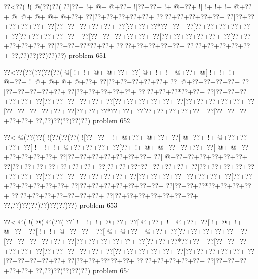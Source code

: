 \vbox{\vbox{\goo
\0??<\0??(\- !(\- @(\0??(\0??(
\0??[\0??+\- !+\- @+\- @+\0??+
\- ![\0??+\0??+\- !+\- @+\0??+
\- ![\- !+\- !+\- !+\- @+\0??+
\- @[\- @+\- @+\- @+\- @+\0??+
\0??[\0??+\0??+\0??+\0??+\0??+
\0??[\0??+\0??+\0??+\0??+\0??+
\0??[\0??+\0??+\0??+\0??+\0??+
\0??[\0??+\0??+\0??+\0??+\0??+
\0??[\0??+\0??+\0??*\0??+\0??+
\0??[\0??+\0??+\0??+\0??+\0??+
\0??[\0??+\0??+\0??+\0??+\0??+
\0??[\0??+\0??+\0??+\0??+\0??+
\0??[\0??+\0??+\0??+\0??+\0??+
\0??[\0??+\0??+\0??+\0??+\0??+
\0??[\0??+\0??+\0??*\0??+\0??+
\0??[\0??+\0??+\0??+\0??+\0??+
\0??[\0??+\0??+\0??+\0??+\0??+
\0??,\0??)\0??)\0??)\0??)\0??)
}
\hfil problem 651\hfil\break
}

\vbox{\vbox{\goo
\0??<\0??(\0??(\0??(\0??(\0??(
\- @[\- !+\- !+\- @+\- @+\0??+
\0??[\- @+\- !+\- !+\- @+\0??+
\- @[\- !+\- !+\- !+\- @+\0??+
\- ![\- @+\- @+\- @+\- @+\0??+
\0??[\0??+\0??+\0??+\0??+\0??+
\0??[\- @+\0??+\0??+\0??+\0??+
\0??[\0??+\0??+\0??+\0??+\0??+
\0??[\0??+\0??+\0??+\0??+\0??+
\0??[\0??+\0??+\0??*\0??+\0??+
\0??[\0??+\0??+\0??+\0??+\0??+
\0??[\0??+\0??+\0??+\0??+\0??+
\0??[\0??+\0??+\0??+\0??+\0??+
\0??[\0??+\0??+\0??+\0??+\0??+
\0??[\0??+\0??+\0??+\0??+\0??+
\0??[\0??+\0??+\0??*\0??+\0??+
\0??[\0??+\0??+\0??+\0??+\0??+
\0??[\0??+\0??+\0??+\0??+\0??+
\0??,\0??)\0??)\0??)\0??)\0??)
}
\hfil problem 652\hfil\break
}

\vbox{\vbox{\goo
\0??<\- @(\0??(\0??(\- !(\0??(\0??(\0??(
\- ![\0??+\0??+\- !+\- @+\0??+\- @+\0??+
\0??[\- @+\0??+\- !+\- @+\0??+\0??+\0??+
\0??[\- !+\- !+\- !+\- @+\0??+\0??+\0??+
\0??[\0??+\- !+\- @+\- @+\0??+\0??+\0??+
\0??[\- @+\- @+\0??+\0??+\0??+\0??+\0??+
\0??[\0??+\0??+\0??+\0??+\0??+\0??+\0??+
\0??[\- @+\0??+\0??+\0??+\0??+\0??+\0??+
\0??[\0??+\0??+\0??+\0??+\0??+\0??+\0??+
\0??[\0??+\0??+\0??*\0??+\0??+\0??+\0??+
\0??[\0??+\0??+\0??+\0??+\0??+\0??+\0??+
\0??[\0??+\0??+\0??+\0??+\0??+\0??+\0??+
\0??[\0??+\0??+\0??+\0??+\0??+\0??+\0??+
\0??[\0??+\0??+\0??+\0??+\0??+\0??+\0??+
\0??[\0??+\0??+\0??+\0??+\0??+\0??+\0??+
\0??[\0??+\0??+\0??*\0??+\0??+\0??+\0??+
\0??[\0??+\0??+\0??+\0??+\0??+\0??+\0??+
\0??[\0??+\0??+\0??+\0??+\0??+\0??+\0??+
\0??,\0??)\0??)\0??)\0??)\0??)\0??)\0??)
}
\hfil problem 653\hfil\break
}

\vbox{\vbox{\goo
\0??<\- @(\- !(\- @(\- @(\0??(
\0??[\- !+\- !+\- !+\- @+\0??+
\0??[\- @+\0??+\- !+\- @+\0??+
\0??[\- !+\- @+\- !+\- @+\0??+
\0??[\- !+\- !+\- @+\0??+\0??+
\0??[\- @+\- @+\0??+\- @+\0??+
\0??[\0??+\0??+\0??+\0??+\0??+
\0??[\0??+\0??+\0??+\0??+\0??+
\0??[\0??+\0??+\0??+\0??+\0??+
\0??[\0??+\0??+\0??*\0??+\0??+
\0??[\0??+\0??+\0??+\0??+\0??+
\0??[\0??+\0??+\0??+\0??+\0??+
\0??[\0??+\0??+\0??+\0??+\0??+
\0??[\0??+\0??+\0??+\0??+\0??+
\0??[\0??+\0??+\0??+\0??+\0??+
\0??[\0??+\0??+\0??*\0??+\0??+
\0??[\0??+\0??+\0??+\0??+\0??+
\0??[\0??+\0??+\0??+\0??+\0??+
\0??,\0??)\0??)\0??)\0??)\0??)
}
\hfil problem 654\hfil\break
}

